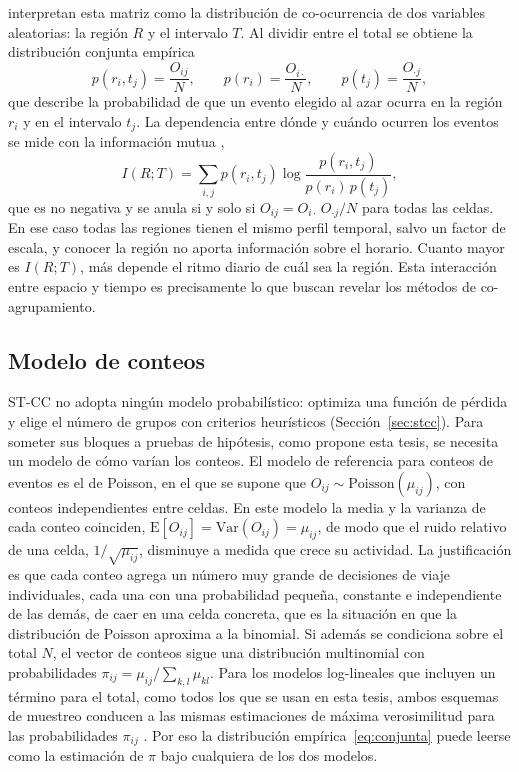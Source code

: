 \cite{Liu2021} interpretan esta matriz como la distribución de co-ocurrencia de dos
variables aleatorias: la región $R$ y el intervalo $T$. Al dividir entre el total
se obtiene la distribución conjunta empírica
\begin{equation}\label{eq:conjunta}
  p(r_i, t_j) = \frac{O_{ij}}{N}, \qquad
  p(r_i) = \frac{O_{i\cdot}}{N}, \qquad
  p(t_j) = \frac{O_{\cdot j}}{N},
\end{equation}
que describe la probabilidad de que un evento elegido al azar ocurra en la región
$r_i$ y en el intervalo $t_j$. La dependencia entre dónde y cuándo ocurren los
eventos se mide con la información mutua \cite{Cover2006},
\begin{equation}\label{eq:im}
  I(R;T) = \sum_{i,j} p(r_i,t_j) \log \frac{p(r_i,t_j)}{p(r_i)\,p(t_j)} ,
\end{equation}
que es no negativa y se anula si y solo si
$O_{ij} = O_{i\cdot}\,O_{\cdot j}/N$ para todas las celdas. En ese caso todas las
regiones tienen el mismo perfil temporal, salvo un factor de escala, y conocer la
región no aporta información sobre el horario. Cuanto mayor es $I(R;T)$, más
depende el ritmo diario de cuál sea la región. Esta interacción entre
espacio y tiempo es precisamente lo que buscan revelar los métodos de
co-agrupamiento.

\subsection{Modelo de conteos}\label{sec:modelo-conteos}

ST-CC no adopta ningún modelo probabilístico: optimiza una función de pérdida y
elige el número de grupos con criterios heurísticos (Sección~\ref{sec:stcc}).
Para someter sus bloques a pruebas de hipótesis, como propone esta tesis, se
necesita un modelo de cómo varían los conteos. El modelo de referencia para
conteos de eventos es el de Poisson, en el que se supone que
$O_{ij} \sim \mathrm{Poisson}(\mu_{ij})$, con conteos independientes entre celdas.
En este modelo la media y la varianza de cada conteo coinciden,
$\mathrm{E}[O_{ij}] = \mathrm{Var}(O_{ij}) = \mu_{ij}$, de modo que el ruido
relativo de una celda, $1/\sqrt{\mu_{ij}}$, disminuye a medida que crece su
actividad. La justificación es que cada conteo agrega un número muy grande de
decisiones de viaje individuales, cada una con una probabilidad pequeña,
constante e independiente de las demás, de caer en una celda concreta, que es la
situación en que la distribución de Poisson aproxima a la binomial. Si además se
condiciona sobre el total $N$, el vector de conteos sigue una distribución
multinomial con probabilidades $\pi_{ij} = \mu_{ij}/\sum_{k,l} \mu_{kl}$. Para
los modelos log-lineales que incluyen un término para el total, como todos los
que se usan en esta tesis, ambos esquemas de muestreo conducen a las mismas
estimaciones de máxima verosimilitud para las probabilidades $\pi_{ij}$
\cite{Agresti2013}. Por eso la distribución empírica~\eqref{eq:conjunta} puede
leerse como la estimación de $\pi$ bajo cualquiera de los dos modelos.


